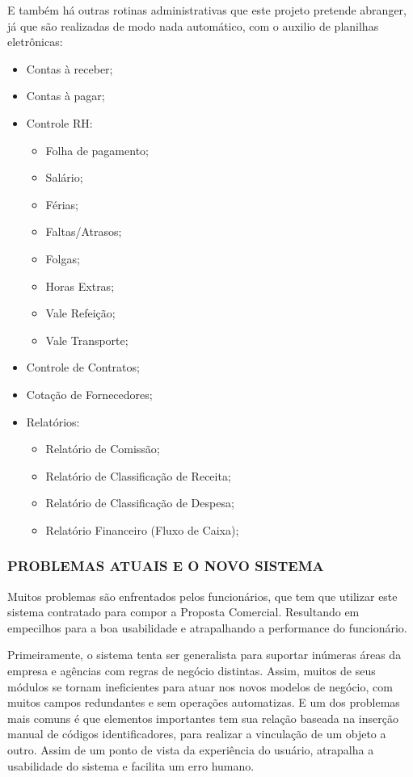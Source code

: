 \documentclass[
  12pt,				%
  openany,
  oneside,
  a4paper,			%
  english,			%
  brazil
]{article}
\numberwithin{figure}{section}
\numberwithin{table}{section}
\begin{document}
E também há outras rotinas administrativas que este projeto pretende abranger, já que são realizadas de modo nada automático, com o auxilio de planilhas eletrônicas: 

{\singlespacing
\begin{itemize}
  \item Contas à receber;
  \item Contas à pagar;
  \item Controle RH:
  \begin{itemize}
    \item Folha de pagamento;
    \item Salário;
    \item Férias;
    \item Faltas/Atrasos;
    \item Folgas;
    \item Horas Extras;
    \item Vale Refeição;
    \item Vale Transporte;
  \end{itemize}
  \item Controle de Contratos;
  \item Cotação de Fornecedores;
  \item Relatórios:
  \begin{itemize}
    \item Relatório de Comissão;
    \item Relatório de Classificação de Receita;
    \item Relatório de Classificação de Despesa;
    \item Relatório Financeiro (Fluxo de Caixa);
  \end{itemize}
\end{itemize}
}


\subsubsection{PROBLEMAS ATUAIS E O NOVO SISTEMA}

Muitos problemas são enfrentados pelos funcionários, que tem que utilizar este sistema contratado para compor a Proposta Comercial. Resultando em empecilhos para a boa usabilidade e atrapalhando a performance do funcionário.

Primeiramente, o sistema tenta ser generalista para suportar inúmeras áreas da empresa e agências com regras de negócio distintas. Assim, muitos de seus módulos se tornam ineficientes para atuar nos novos modelos de negócio, com muitos campos redundantes e sem operações automatizas. E um dos problemas mais comuns é que elementos importantes tem sua relação baseada na inserção manual de códigos identificadores, para realizar a vinculação de um objeto a outro. Assim de um ponto de vista da experiência do usuário, atrapalha a usabilidade do sistema e facilita um erro humano.
\end{document}

